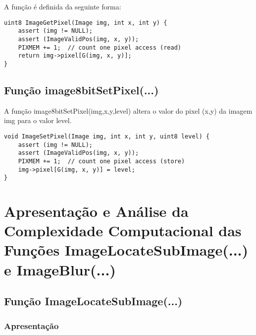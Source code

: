 \documentclass{report}
\begin{document}
A função é definida da seguinte forma:
\begin{lstlisting}
uint8 ImageGetPixel(Image img, int x, int y) {
    assert (img != NULL);
    assert (ImageValidPos(img, x, y));
    PIXMEM += 1;  // count one pixel access (read)
    return img->pixel[G(img, x, y)];  
} 
\end{lstlisting}

\section{Função image8bitSetPixel(...)}
A função image8bitSetPixel(img,x,y,level) altera o valor do pixel (x,y) da imagem img para o valor level.
\par
\begin{lstlisting}
void ImageSetPixel(Image img, int x, int y, uint8 level) {
    assert (img != NULL);
    assert (ImageValidPos(img, x, y));
    PIXMEM += 1;  // count one pixel access (store)
    img->pixel[G(img, x, y)] = level;
} 
\end{lstlisting}

\chapter{Apresentação e Análise da Complexidade Computacional das Funções ImageLocateSubImage(...) e ImageBlur(...)}

\section{Função ImageLocateSubImage(...)}
\subsection{Apresentação}
\end{document}
